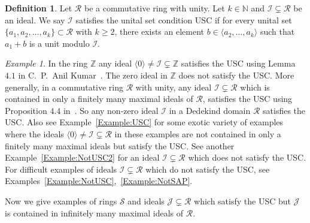 \documentclass[12pt]{amsart}
\newcommand{\subs}{\subset}
\newcommand{\sbnq}{\subsetneq}
\newcommand{\mbb}{\mathbb}
\newcommand{\mcl}{\mathcal}
\newcommand{\I}{\mcl I}
\newcommand{\Z}{\mbb Z}
\newcommand{\R}{\mcl R}
\theoremstyle{plain}
\theoremstyle{definition}
\newtheorem{defn}[theorem]{Definition}
\theoremstyle{remark}
\newtheorem{example}[theorem]{Example}
\numberwithin{equation}{section}
\begin{document}

\begin{defn}
	\label{defn:UnitalSetCond} Let $\R$ be a commutative ring with unity. Let $k\in \mbb{N}$ and $\mcl{I} \sbnq \mcl{\R}$ be an ideal. 
	We say $\mcl{I}$ satisfies the unital set condition USC if for every unital set
	$\{a_1,a_2,\ldots,a_k\} \subs \R$ with $k \geq 2$, there exists an
	element $b \in \langle a_2,\ldots,a_k\rangle$ such that $a_1+b$ is a unit modulo
	$\mcl{I}$.
\end{defn}
\begin{example}
	In the ring $\Z$ any ideal $\langle 0\rangle \neq \mcl{I}\subsetneq \Z$ satisfies the USC using Lemma $4.1$ in C.~P.~Anil Kumar~\cite{CPAKII}. The zero ideal in $\Z$ does not satisfy the USC. More generally, in a commutative ring $\R$ with unity, any ideal $\mcl{I}\sbnq \R$ which is contained in only a finitely many maximal ideals of $\R$, satisfies the USC using Proposition $4.4$ in~\cite{CPAKII}. So any non-zero ideal $\I$ in a Dedekind domain $\R$ satisfies the USC. Also see Example~\ref{Example:USC} for some exotic variety of examples where the ideals $\langle 0\rangle \neq \I\sbnq \R$ in these examples are not contained in only a finitely many maximal ideals but satisfy the USC. See another Example~\ref{Example:NotUSC2} for an ideal $\I\sbnq \R$ which does not satisfy the USC. For difficult examples of ideals $\I\sbnq \R$ which do not satisfy the USC, see Examples~\ref{Example:NotUSC},~\ref{Example:NotSAP}.
\end{example}
Now we give examples of rings $\mcl{S}$ and ideals $\mcl{J}\sbnq \R$ which satisfy the USC but $\mcl{J}$ is contained in infinitely many maximal ideals of $\R$. 
\end{document}
